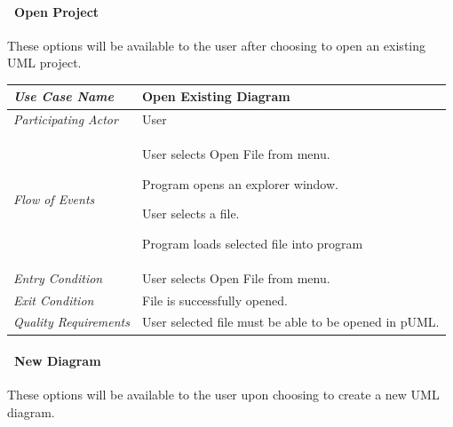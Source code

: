 \documentclass[twoside,letterpaper]{article}
\newenvironment{my_enumerate}{
\begin{enumerate}
  \setlength{\itemsep}{1pt}
  \setlength{\parskip}{0pt}
  \setlength{\parsep}{0pt}}{\end{enumerate}
}
\begin{document}
\clearpage


\paragraph[\ Use Category]
{\ Open Project} {These options will be available to the user after choosing to open an existing UML project.}

\begin{flushleft}
\tablehead{}
\begin{tabular}{|m{2.0in} m{5.0in}|}
\hline
{\bfseries\emph{Use Case Name}}
& {\bfseries Open Existing Diagram}
\\\hline
\emph{Participating Actor}
& User
\\\hline
\emph{Flow of Events}
& \begin{my_enumerate}
\item User selects Open File from menu.
\item Program opens an explorer window.
\item User selects a file.
\item Program loads selected file into program
\end{my_enumerate}
\\\hline
\emph{Entry Condition}
& User selects Open File from menu.
\\\hline
\emph{Exit Condition}
& File is successfully opened.
\\\hline
\emph{Quality Requirements}
& User selected file must be able to be opened in pUML.
\\\hline
\end{tabular}
\end{flushleft}
\bigskip

\clearpage

\paragraph[\ Use Category]
{\ New Diagram} {These options will be available to the user upon choosing to create a new UML diagram.}
\end{document}
